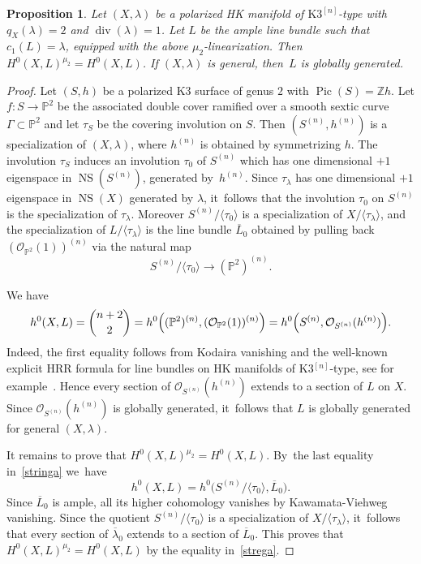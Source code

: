 \documentclass[JEP,XML,SOM,Unicode,published]{cedram}
\newcommand{\HK}{\textup{HK}\xspace}
\newcommand{\PP}{{\mathbb P}}\let\P\PP
\newcommand{\ZZ}{{\mathbb Z}}\let\Z\ZZ
\newcommand\cO{\mathcal{O}}
\DeclareMathOperator{\divisore}{div}\let\div\divisore
\DeclareMathOperator{\NS}{NS}
\DeclareMathOperator{\Pic}{Pic}
\let\la\langle
\let\ov\overline
\let\ra\rangle
\newtheorem{prop}[lemm]{Proposition}
\theoremstyle{definition}
\begin{document}
\begin{prop}\label{prop:sezinv}
Let $(X,\lambda)\!$ be a polarized \HK manifold of $\mathrm{K3}^{[n]}$-type with~\hbox{$q_X(\lambda)\!=\!2$} and $\divisore(\lambda)=1$.
Let $L$ be the ample line bundle such that $c_1(L)=\lambda$, equipped with the above $\mu_2$-linearization.
Then $H^0(X,L)^{\mu_2}=H^0(X,L)$.
If $(X,\lambda)$ is general, then~$L$ is globally generated.
\end{prop}

\begin{proof}
Let $(S,h)$ be a polarized K3 surface of genus $2$ with $\Pic(S)=\ZZ h$.
Let $f\colon S\to\PP^2$ be the associated double cover ramified over a smooth sextic curve $\Gamma\subset \PP^2$ and let $\tau_S$ be the covering involution on $S$.
Then $(S^{(n)},h^{(n)})$ is a specialization of $(X,\lambda)$, where $h^{(n)}$ is obtained by symmetrizing $h$.
The involution $\tau_S$ induces an involution $\tau_0$ of $S^{(n)}$ which has one dimensional $+1$ eigenspace in $\NS(S^{(n)})$, generated by~$h^{(n)}$.
Since $\tau_{\lambda}$ has one dimensional $+1$ eigenspace in $\NS(X)$ generated by $\lambda$, it~follows that the involution $\tau_0$ on $S^{(n)}$ is the specialization of $\tau_{\lambda}$.
Moreover $S^{(n)}/\la\tau_0\ra$ is a specialization of $X/\la\tau_{\lambda}\ra$, and the specialization of $L/\langle \tau_\lambda\rangle$ is the line bundle $\ov{L}_0$ obtained by pulling back $(\cO_{\PP^2}(1))^{(n)}$
via the natural map\vspace*{-3pt}\enlargethispage{\baselineskip}
\begin{equation*}
S^{(n)}/\la\tau_0\ra\to(\PP^2)^{(n)}.
\end{equation*}
\par\vspace*{-5pt}%
\noindent
We have\vspace*{-5pt}
\begin{equation}\label{stringa}
h^0(X,L)=\binom{n+2}{2}=h^0\Bigl((\PP^2)^{(n)},(\cO_{\PP^2}(1))^{(n)}\Bigr)=h^0\Bigl(S^{(n)},\cO_{S^{(n)}}(h^{(n)})\Bigr).
\end{equation}
Indeed, the first equality follows from Kodaira vanishing and the well-known explicit HRR formula for line bundles on \HK manifolds of K3$^{[n]}$-type, see for example~\cite[Eq.\,(5)]{Debarre:Survey}.
Hence every section of $\cO_{S^{(n)}}(h^{(n)})$ extends to a section of $L$ on $X$.
Since $\cO_{S^{(n)}}(h^{(n)})$ is globally generated, it~follows that $L$ is globally generated for general $(X,\lambda)$.

It remains to prove that $H^0(X,L)^{\mu_2}\!=\!H^0(X,L)$. By~the last equality in~\eqref{stringa} we~have\vspace*{-5pt}
\begin{equation}\label{strega}
h^0(X,L)=h^0\bigl(S^{(n)}/\la\tau_0\ra,\ov{L}_0\bigr).
\end{equation}
Since $\ov{L}_0$ is ample, all its higher cohomology vanishes by Kawamata-Viehweg vanishing.
Since the quotient $S^{(n)}/\la \tau_0\ra$ is a specialization of $X/\la\tau_{\lambda}\ra$, it~follows that every section of $\ov{\lambda}_0$ extends to a section of $\ov{L}_0$. This proves that $H^0(X,L)^{\mu_2}=H^0(X,L)$ by the equality in~\eqref{strega}.
\end{proof}
\end{document}
